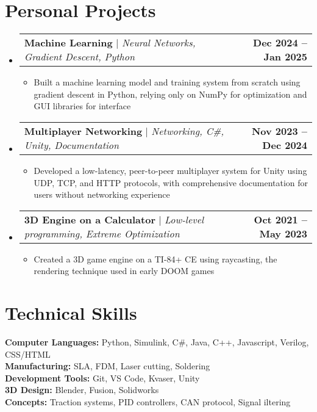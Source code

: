 \documentclass[letterpaper,11pt]{article}
\makeatletter
\newcommand{\resumeItem}[1]{
  \item\small{
    {#1 \vspace{-2pt}}
  }
}
\newcommand{\resumeProjectHeading}[2]{
    \item
    \begin{tabular*}{1.001\textwidth}{l@{\extracolsep{\fill}}r}
      \small#1 & \textbf{\small #2}\\
    \end{tabular*}\vspace{-7pt}
}
\newcommand{\resumeSubHeadingListStart}{\begin{itemize}[leftmargin=0.0in, label={}]}
\newcommand{\resumeSubHeadingListEnd}{\end{itemize}}
\newcommand{\resumeItemListStart}{\begin{itemize}}
\newcommand{\resumeItemListEnd}{\end{itemize}\vspace{-5pt}}
\makeatother
\begin{document}
\section{Personal Projects}
    \vspace{-5pt}
    \resumeSubHeadingListStart
      \resumeProjectHeading
          {\textbf{Machine Learning} $|$ \emph{Neural Networks, Gradient Descent, Python}}{Dec 2024 -- Jan 2025}
          \resumeItemListStart 
            \resumeItem{Built a machine learning model and training system from scratch using gradient descent in Python, relying only on NumPy for optimization and GUI libraries for interface}
          \resumeItemListEnd
          \vspace{-16pt}
      \resumeProjectHeading
          {\textbf{Multiplayer Networking} $|$ \emph{Networking, C\#, Unity, Documentation}}{Nov 2023 -- Dec 2024}
          \resumeItemListStart
            \resumeItem{Developed a low-latency, peer-to-peer multiplayer system for Unity using UDP, TCP, and HTTP protocols, with comprehensive documentation for users without networking experience}
          \resumeItemListEnd
          \vspace{-16pt}
      \resumeProjectHeading
          {\textbf{3D Engine on a Calculator} $|$ \emph{Low-level programming, Extreme Optimization}}{Oct 2021 -- May 2023}
          \resumeItemListStart
            \resumeItem{Created a 3D game engine on a TI-84+ CE using raycasting, the rendering technique used in early DOOM games}
          \resumeItemListEnd
          \vspace{-16pt}
    \resumeSubHeadingListEnd
\vspace{5pt} 


\section{Technical Skills}
 \begin{itemize}[leftmargin=0.15in, label={}]
    \small{\item{
     \textbf{Computer Languages:}{ Python, Simulink, C\#, Java, C++, Javascript, Verilog, CSS/HTML} \\
     \textbf{Manufacturing:}{ SLA, FDM, Laser cutting, Soldering} \\
     \textbf{Development Tools:}{ Git, VS Code, Kvaser, Unity} \\
     \textbf{3D Design:}{ Blender, Fusion, Solidworks} \\
     \textbf{Concepts:}{ Traction systems, PID controllers, CAN protocol, Signal iltering} }}
 \end{itemize}
 \vspace{-16pt} 
\end{document}
